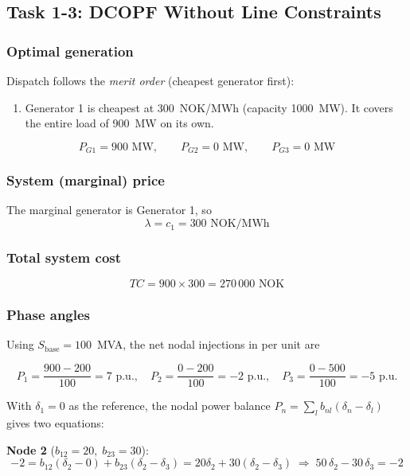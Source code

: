 \subsection{Task 1-3: DCOPF Without Line Constraints}

\subsubsection*{Optimal generation}

Dispatch follows the \emph{merit order} (cheapest generator first):

\begin{enumerate}
  \item Generator 1 is cheapest at 300~NOK/MWh (capacity 1000~MW).
        It covers the entire load of 900~MW on its own.
\end{enumerate}

\[
  P_{G1} = 900 \text{ MW}, \qquad P_{G2} = 0 \text{ MW}, \qquad P_{G3} = 0 \text{ MW}
\]

\subsubsection*{System (marginal) price}

The marginal generator is Generator 1, so
\[
  \lambda = c_1 = 300 \text{ NOK/MWh}
\]

\subsubsection*{Total system cost}

\[
  TC = 900 \times 300 = 270\,000 \text{ NOK}
\]

\subsubsection*{Phase angles}

Using $S_{\text{base}} = 100$~MVA, the net nodal injections in per unit are

\[
  P_1 = \frac{900-200}{100} = 7 \text{ p.u.}, \quad
  P_2 = \frac{0-200}{100}   = -2 \text{ p.u.}, \quad
  P_3 = \frac{0-500}{100}   = -5 \text{ p.u.}
\]

With $\delta_1 = 0$ as the reference, the nodal power balance
$P_n = \sum_l b_{nl}(\delta_n - \delta_l)$ gives two equations:

\textbf{Node 2} ($b_{12}=20,\; b_{23}=30$):
\[
  -2 = b_{12}(\delta_2 - 0) + b_{23}(\delta_2 - \delta_3)
     = 20\delta_2 + 30(\delta_2 - \delta_3)
  \;\Rightarrow\; 50\,\delta_2 - 30\,\delta_3 = -2
\]

